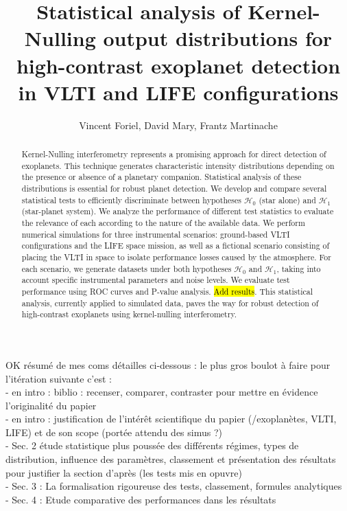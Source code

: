 \documentclass{article}
\title{Statistical analysis of Kernel-Nulling output distributions for high-contrast exoplanet detection in VLTI and LIFE configurations}
\author{Vincent Foriel,
        David Mary,
        Frantz Martinache
       }
\newcommand{\dm}[1]{{\color{mulberry} #1}}
\begin{document}
\maketitle

\begin{abstract}
Kernel-Nulling interferometry represents a promising approach for direct detection of exoplanets. This technique generates characteristic intensity distributions depending on the presence or absence of a planetary companion. Statistical analysis of these distributions is essential for robust planet detection. We develop and compare several statistical tests to efficiently discriminate between hypotheses $\mathcal{H}_0$ (star alone) and $\mathcal{H}_1$ (star-planet system). We analyze the performance of different test statistics to evaluate the relevance of each according to the nature of the available data. We perform numerical simulations for three instrumental scenarios: ground-based VLTI configurations and the LIFE space mission, as well as a fictional scenario consisting of placing the VLTI in space to isolate performance losses caused by the atmosphere. For each scenario, we generate datasets under both hypotheses $\mathcal{H}_0$ and $\mathcal{H}_1$, taking into account specific instrumental parameters and noise levels. We evaluate test performance using ROC curves and P-value analysis. \hl{Add results}. This statistical analysis, currently applied to simulated data, paves the way for robust detection of high-contrast exoplanets using kernel-nulling interferometry.
\end{abstract}

\dm{OK résumé de mes coms détailles ci-dessous : le plus gros boulot à faire pour l'itération suivante c'est : \\
- en intro : biblio : recenser, comparer, contraster pour mettre en évidence l'originalité du papier\\
- en intro : justification de l'intérêt scientifique du papier (/exoplanètes, VLTI, LIFE) et de son scope (portée attendu des simus ?) \\
- Sec. 2 étude statistique plus poussée des différents régimes, types de distribution, influence des paramètres, classement et présentation des résultats pour justifier la section d'après (les tests mis en opuvre)\\
- Sec. 3 : La formalisation rigoureuse des tests, classement, formules analytiques \\
- Sec. 4 : Etude comparative des performances dans les résultats }
\end{document}
